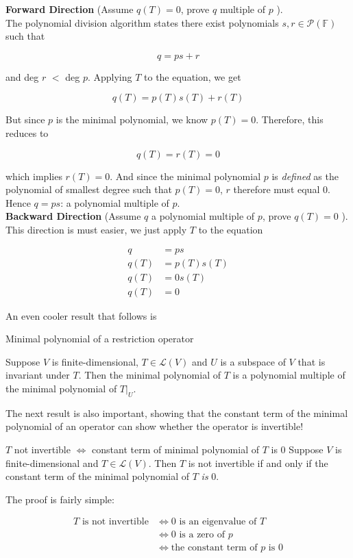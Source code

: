\documentclass[svgnames]{article}     %
\begin{document}
\textbf{Forward Direction} (Assume $q(T) = 0$, prove $q$ multiple of $p$ ). \\
The
polynomial division algorithm states there exist polynomials $s, r \in
\mathcal{P} (\mathbb{F} ) $ such that 

\[
q = ps + r
\] \vspace{3px}

and deg $r$ $<$ deg $p$. Applying $T$ to the equation, we get 

\[
q(T) = p(T) s(T) + r(T)
\] \vspace{3px}

But since $p$ is the minimal polynomial, we know $p(T) = 0 $. Therefore, this
reduces to 

\[
q(T) = r(T) = 0
\] \vspace{3px}

which implies $r(T) = 0$. And since the minimal polynomial $p$ is
\textit{defined} as the polynomial of smallest degree such that $p(T) = 0$, $r$
therefore must equal 0. Hence $q = ps$: a polynomial multiple of $p$. \\


\textbf{Backward Direction} (Assume $q$ a polynomial multiple of $p$, prove
$q(T) = 0$ ). \\ 

This direction is must easier, we just apply $T$ to the equation 

\begin{align*}
  q &= ps  \\ q(T) &= p(T)s(T) \\ q(T) &= 0s(T) \\ q(T) &= 0 
\end{align*}

An even cooler result that  follows is 

\begin{mainbox}{Minimal polynomial of a restriction operator}
  
  Suppose $V$ is finite-dimensional, $T \in \mathcal{L} (V)$ and $U$ is
  a subspace of $V$ that is invariant under $T$. Then the minimal polynomial of
  $T$ is a polynomial multiple of the minimal polynomial of $T\big|_U$. 

\end{mainbox}

The next result is also important, showing that the constant term of the
minimal polynomial of an operator can show whether the operator is invertible! 


\begin{mainbox}{$T$ not invertible $\Leftrightarrow$ constant term of minimal
polynomial of $T$ is 0}
  Suppose $V$ is finite-dimensional and $T\in \mathcal{L} (V)$. Then $T$ is not
  invertible if and only if the constant term of the minimal polynomial of $T$ 
  \textit{is} 0. 
\end{mainbox}


The proof is fairly simple: 

\begin{align*}
  T \text{ is not invertible}  &\Longleftrightarrow 0 \text{ is an eigenvalue
  of }  T \\ &\Longleftrightarrow 0 \text{ is a zero of } p \\ &\Longleftrightarrow \text{the constant term of } p \text{ is 0} 
\end{align*}
\end{document}
